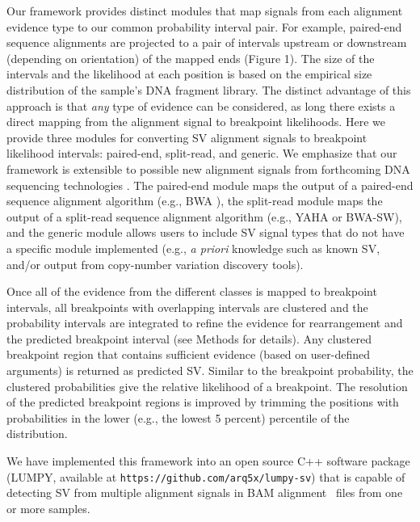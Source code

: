 \documentclass[10pt]{bmc_article}
\def\texttt{[image: ]}
\newenvironment{bmcformat}{\begin{raggedright}\baselineskip20pt\sloppy\setboolean{publ}{false}}{\end{raggedright}\baselineskip20pt\sloppy}
\begin{document}
\begin{bmcformat}
Our framework provides distinct modules that map signals from each alignment
evidence type to our common probability interval pair.  For example, paired-end
sequence alignments are projected to a pair of intervals upstream or downstream
(depending on orientation) of the mapped ends (Figure 1).  The size of the
intervals and the likelihood at each position is based on the empirical size
distribution of the sample's DNA fragment library.  The distinct advantage of
this approach is that \emph{any} type of evidence can be considered, as long
there exists a direct mapping from the alignment signal to breakpoint
likelihoods.  Here we provide three modules for converting SV alignment signals
to breakpoint likelihood intervals: paired-end, split-read, and generic.  We
emphasize that our framework is extensible to possible new alignment signals
from forthcoming DNA sequencing technologies \cite{clarke2009}. The paired-end
module maps the output of a paired-end sequence alignment algorithm
(e.g., BWA \cite{li2009a}), the split-read module maps the output of a
split-read sequence alignment algorithm (e.g., YAHA\cite{faust2012} or
BWA-SW\cite{li2010}), and the generic module allows users to include
SV signal types that do not have a specific module implemented (e.g.,
\emph{a priori} knowledge such as known SV, and/or output from
copy-number variation discovery tools).

Once all of the evidence from the different classes is mapped to breakpoint
intervals, all breakpoints with overlapping intervals are clustered and
the probability intervals are integrated to refine the evidence for
rearrangement and the predicted breakpoint interval (see Methods for details). 
Any clustered breakpoint region that contains sufficient evidence (based on
user-defined arguments) is returned as predicted SV. 
Similar to the breakpoint probability, the clustered probabilities give the
relative likelihood of a breakpoint.  The resolution of the predicted breakpoint
regions is improved by trimming the positions with probabilities
in the lower (e.g., the lowest 5 percent) percentile of the distribution.

We have implemented this framework into an open source C++ software package
(LUMPY, available at {\tt https://github.com/arq5x/lumpy-sv})
that is capable of detecting SV from multiple alignment signals in BAM
alignment~\cite{li2009b} files from one or more samples. 



\end{bmcformat}
\end{document}
